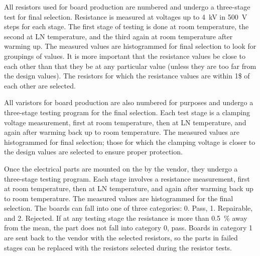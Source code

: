 All resistors used for board production are numbered and undergo a three-stage  test for final selection. Resistance is measured at voltages up to \SI{4}{kV} in \SI{500}{V} steps for each stage. The first stage of testing is done at  room temperature, the second at LN temperature, and the third again at room temperature after warming up.  The measured values are histogrammed for final selection to look for groupings of values.   
It is more important that the resistance values be close to each other than that they be at any particular value (unless they are too far from the design values). The resistors for which the resistance values are within 1\$  of each other are selected.   

All varistors for board production are also numbered for  purposes and undergo a three-stage  testing program for the final selection. Each test stage is a clamping voltage measurement, first at room temperature, then at LN temperature, and again after warming back up to room temperature.  
The measured values are histogrammed for final selection; those for which the clamping voltage is closer to the design values are selected to ensure proper protection.   

Once the electrical parts are mounted on the  by the vendor, they undergo a three-stage  testing program. Each stage involves a resistance measurement, first at room temperature, then at LN temperature, and again after warming back up to room temperature.  The measured values are histogrammed for the final selection.
The boards can fall into one of three categories: 0. Pass, 1. Repairable, and 2. Rejected.  
If at any testing stage the resistance is more than \SI{0.5}{\%} away from the mean, the part does not fall into category 0, pass.  Boards in category 1 are sent back to the vendor with the selected resistors, so the parts in failed stages can be replaced with the resistors selected during the resistor tests. %


